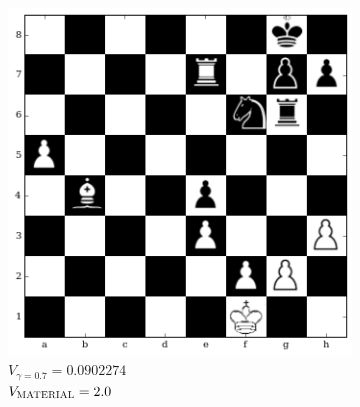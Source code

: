 \begin{figure}[h]
 \hspace*{-0.5in}  
    \begin{subfigure}[t]{0.45\textwidth}
        \centering
        
    \includegraphics[width=\textwidth]{img/table_evaluations/output_34_0.png}
         \caption{$V_{\gamma=0.7} = 0.0902274$\\  
$V_{\textsc{MATERIAL}}= 2.0 $}
    \end{subfigure}
   \hspace{1em}
  \centering
    \begin{subfigure}[t]{0.45\textwidth}
        \centering
        

\end{subfigure}
\end{figure}

